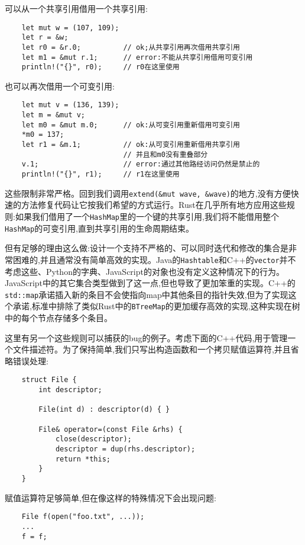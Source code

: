 可以从一个共享引用借用一个共享引用:
\begin{verbatim}
    let mut w = (107, 109);
    let r = &w;
    let r0 = &r.0;          // ok;从共享引用再次借用共享引用
    let m1 = &mut r.1;      // error:不能从共享引用借用可变引用
    println!("{}", r0);     // r0在这里使用
\end{verbatim}

也可以再次借用一个可变引用:
\begin{verbatim}
    let mut v = (136, 139);
    let m = &mut v;
    let m0 = &mut m.0;      // ok:从可变引用重新借用可变引用
    *m0 = 137;
    let r1 = &m.1;          // ok:从可变引用重新借用共享引用
                            // 并且和m0没有重叠部分
    v.1;                    // error:通过其他路经访问仍然是禁止的
    println!("{}", r1);     // r1在这里使用
\end{verbatim}

这些限制非常严格。回到我们调用\texttt{extend(\&mut wave, \&wave)}的地方,没有方便快速的方法修复代码让它按我们希望的方式运行。Rust在几乎所有地方应用这些规则:如果我们借用了一个\texttt{HashMap}里的一个键的共享引用,我们将不能借用整个\texttt{HashMap}的可变引用,直到共享引用的生命周期结束。

但有足够的理由这么做:设计一个支持不严格的、可以同时迭代和修改的集合是非常困难的,并且通常没有简单高效的实现。Java的\texttt{Hashtable}和C++的\texttt{vector}并不考虑这些、Python的字典、JavaScript的对象也没有定义这种情况下的行为。JavaScript中的其它集合类型做到了这一点,但也导致了更加笨重的实现。C++的\texttt{std::map}承诺插入新的条目不会使指向map中其他条目的指针失效,但为了实现这个承诺,标准中排除了类似Rust中的\texttt{BTreeMap}的更加缓存高效的实现,这种实现在树中的每个节点存储多个条目。

这里有另一个这些规则可以捕获的bug的例子。考虑下面的C++代码,用于管理一个文件描述符。为了保持简单,我们只写出构造函数和一个拷贝赋值运算符,并且省略错误处理:
\begin{verbatim}
    struct File {
        int descriptor;

        File(int d) : descriptor(d) { }

        File& operator=(const File &rhs) {
            close(descriptor);
            descriptor = dup(rhs.descriptor);
            return *this;
        }
    }
\end{verbatim}

赋值运算符足够简单,但在像这样的特殊情况下会出现问题:
\begin{verbatim}
    File f(open("foo.txt", ...));
    ...
    f = f;
\end{verbatim}

